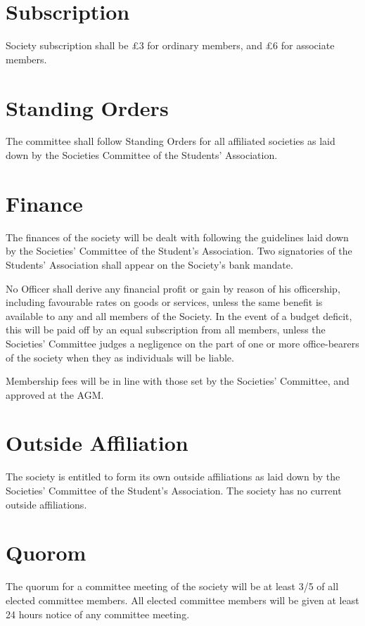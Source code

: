 \documentclass{article}
\begin{document}
\section{Subscription}

Society subscription shall be £3 for ordinary members, and £6 for associate
members.

\section{Standing Orders}

The committee shall follow Standing Orders for all affiliated societies as laid down by the Societies Committee of the Students’ Association.

\section{Finance}

The finances of the society will be dealt with following the guidelines laid down
by the Societies’ Committee of the Student’s Association. Two signatories of the Students’ Association shall appear on the Society’s bank mandate.

No Officer shall derive any financial profit or gain by reason of his officership, including favourable rates on goods or services, unless the same benefit is available to any and all members of the Society. In the event of a budget deficit, this will be paid off by an equal subscription from all members, unless the Societies’ Committee judges a negligence on the part of one or more office-bearers of the society when they as individuals will be liable. 

Membership fees will be in line with those set by the Societies’ Committee, and approved at the AGM.

\section{Outside Affiliation}

The society is entitled to form its own outside affiliations as laid down by the
Societies’ Committee of the Student’s Association. The society has no current
outside affiliations.

\section{Quorom}

The quorum for a committee meeting of the society will be at least 3/5 of all
elected committee members. All elected committee members will be given at
least 24 hours notice of any committee meeting.
\end{document}
